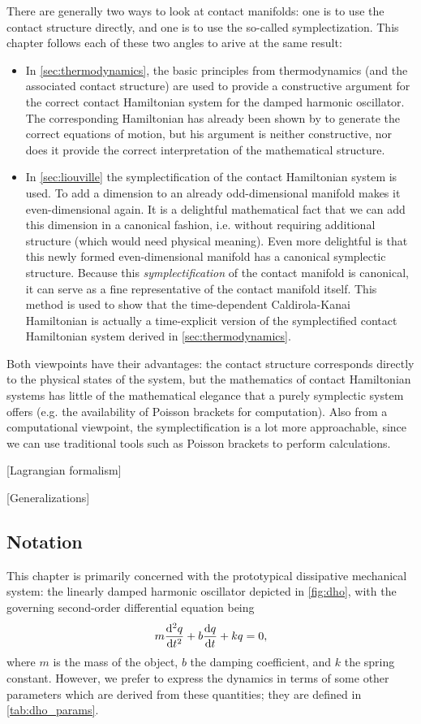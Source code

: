 There are generally two ways to look at contact manifolds: one is to use the contact structure directly, and one is to use the so-called symplectization. This chapter follows each of these two angles to arive at the same result:
\begin{itemize}
    \item In \cref{sec:thermodynamics}, the basic principles from thermodynamics (and the associated contact structure) are used to provide a constructive argument for the correct contact Hamiltonian system for the damped harmonic oscillator. The corresponding Hamiltonian has already been shown by \citet{Bravetti2017} to generate the correct equations of motion, but his argument is neither constructive, nor does it provide the correct interpretation of the mathematical structure.
    \item In \cref{sec:liouville} the symplectification of the contact Hamiltonian system is used. To add a dimension to an already odd-dimensional manifold makes it even-dimensional again. It is a delightful mathematical fact that we can add this dimension in a canonical fashion, i.e. without requiring additional structure (which would need physical meaning). Even more delightful is that this newly formed even-dimensional manifold has a canonical symplectic structure. Because this \emph{symplectification} of the contact manifold is canonical, it can serve as a fine representative of the contact manifold itself. This method is used to show that the time-dependent Caldirola-Kanai Hamiltonian is actually a time-explicit version of the symplectified contact Hamiltonian system derived in \cref{sec:thermodynamics}.
\end{itemize}
Both viewpoints have their advantages: the contact structure corresponds directly to the physical states of the system, but the mathematics of contact Hamiltonian systems has little of the mathematical elegance that a purely symplectic system offers (e.g. the availability of Poisson brackets for computation). Also from a computational viewpoint, the symplectification is a lot more approachable, since we can use traditional tools such as Poisson brackets to perform calculations.

[Lagrangian formalism]

[Generalizations]

\subsection{Notation} 
This chapter is primarily concerned with the prototypical dissipative mechanical system: the linearly damped harmonic oscillator depicted in \cref{fig:dho}, with the governing second-order differential equation being
\begin{equation}  
    m\dv[2]{q}{t} + b\dv{q}{t} + kq = 0,
    \label{eq:dho_eom}
\end{equation}
where $m$ is the mass of the object, $b$ the damping coefficient, and $k$ the spring constant. However, we prefer to express the dynamics in terms of some other parameters which are derived from these quantities; they are defined in \cref{tab:dho_params}.

